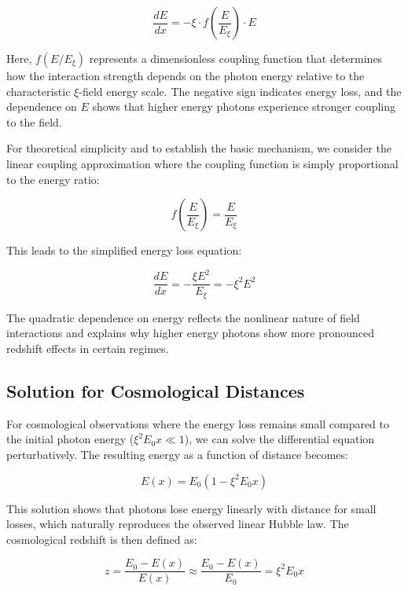 \documentclass[12pt,a4paper]{article}
\begin{document}
	\begin{equation}
		\frac{dE}{dx} = -\xi \cdot f\left(\frac{E}{E_\xi}\right) \cdot E
	\end{equation}
	
	Here, $f(E/E_\xi)$ represents a dimensionless coupling function that determines how the interaction strength depends on the photon energy relative to the characteristic $\xi$-field energy scale. The negative sign indicates energy loss, and the dependence on $E$ shows that higher energy photons experience stronger coupling to the field.
	
	For theoretical simplicity and to establish the basic mechanism, we consider the linear coupling approximation where the coupling function is simply proportional to the energy ratio:
	
	\begin{equation}
		f\left(\frac{E}{E_\xi}\right) = \frac{E}{E_\xi}
	\end{equation}
	
	This leads to the simplified energy loss equation:
	
	\begin{equation}
		\frac{dE}{dx} = -\frac{\xi E^2}{E_\xi} = -\xi^2 E^2
	\end{equation}
	
	The quadratic dependence on energy reflects the nonlinear nature of field interactions and explains why higher energy photons show more pronounced redshift effects in certain regimes.
	
	\subsection{Solution for Cosmological Distances}
	
	For cosmological observations where the energy loss remains small compared to the initial photon energy ($\xi^2 E_0 x \ll 1$), we can solve the differential equation perturbatively. The resulting energy as a function of distance becomes:
	
	\begin{equation}
		E(x) = E_0 \left(1 - \xi^2 E_0 x\right)
	\end{equation}
	
	This solution shows that photons lose energy linearly with distance for small losses, which naturally reproduces the observed linear Hubble law. The cosmological redshift is then defined as:
	
	\begin{equation}
		z = \frac{E_0 - E(x)}{E(x)} \approx \frac{E_0 - E(x)}{E_0} = \xi^2 E_0 x
	\end{equation}
	
\end{document}
